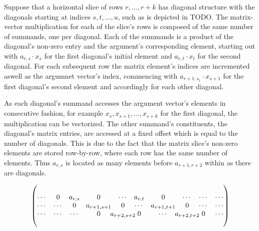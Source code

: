 \documentclass{article}
\newcommand{\tikzmark}[2]{
    \tikz[overlay,remember picture,baseline]
    \node[anchor=base] (#1) {$#2$};
}
\begin{document}
      Suppose that a horizontal slice of rows $r, \ldots, r+k$ has diagonal structure with the diagonals starting at indices $s, t, \ldots, u$, such as is depicted in TODO. The matrix-vector multiplication for each of the slice's rows is composed of the same number of summands, one per diagonal. Each of the summands is a product of the diagonal's non-zero entry and the argument's corresponding element, starting out with $a_{r,s} \cdot x_s$ for the first diagonal's initial element and $a_{r,t} \cdot x_t$ for the second diagonal. For each subsequent row the matrix element's indices are incremented aswell as the argumnet vector's index, commencing with $a_{r+1, s_1} \cdot x_{s+1}$ for the first diagonal's second element and accordingly for each other diagonal.

      As each diagonal's summand accesses the argument vector's elements in consecutive fashion, for example $x_s, x_{s+1}, \ldots, x_{s + k}$ for the first diagonal, the multiplication can be vectorized. The other summand's constituents, the diagonal's matrix entries, are accessed at a fixed offset which is equal to the number of diagonals. This is due to the fact that the matrix slice's non-zero elements are stored row-by-row, where each row has the same number of elements. Thus $a_{r,s}$ is located as many elements before $a_{r+1, r+2}$ within \V as there are diagonals. 

      \begin{equation}
        \begin{pmatrix}
          \\
          \cdots & 0 & \tikzmark{diagAFirst}{a_{r,s}} &  0 & \cdots & \tikzmark{diagBFirst}{a_{r,t}} & 0 & \cdots & \cdots & \cdots \\
          \cdots & \cdots & 0 & a_{r+1,s+1} & 0 & \cdots & a_{r+1,t+1} & 0 & \cdots & \cdots \\
          \cdots & \cdots & \cdots & 0 & \tikzmark{diagALast}{a_{r+2,s+2}} & 0 & \cdots & \tikzmark{diagBLast}{a_{r+2,t+2}} & 0 & \cdots \\
          \\
        \end{pmatrix}
      \end{equation}

\end{document}
